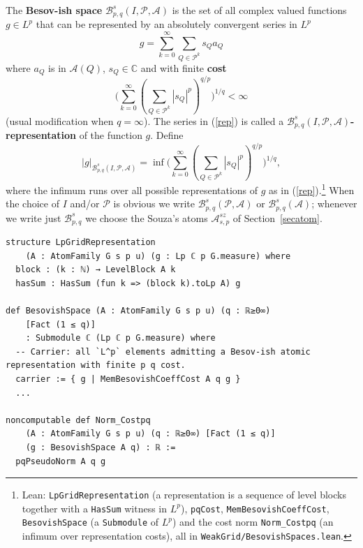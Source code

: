 \documentclass[11pt]{amsart}
\theoremstyle{definition}
\newcommand{\lean}[1]{\texttt{#1}}
\begin{document}
The {\bf Besov-ish space} $\mathcal{B}^s_{p,q}(I,\mathcal{P},\mathcal{A})$ is
the set of all complex valued functions $g \in L^p$ that can be represented by
an absolutely convergent series in $L^p$
\begin{equation} \label{rep} g = \sum_{k=0}^{\infty} \sum_{Q \in \mathcal{P}^k} s_Q a_Q\end{equation}
where $a_Q$ is in $\mathcal{A}(Q)$, $s_Q \in \mathbb{C}$ and with finite
{\bf cost}
\begin{equation} \label{rep2} \big( \sum_{k=0}^{\infty} (\sum_{Q \in \mathcal{P}^k} |s_Q|^p)^{q/p} \big)^{1/q} < \infty\end{equation}
(usual modification when $q = \infty$). The series in (\ref{rep}) is called a
{\bf $\mathcal{B}^s_{p,q}(I,\mathcal{P},\mathcal{A})$-representation} of the
function $g$. Define
$$|g|_{\mathcal{B}^s_{p,q}(I,\mathcal{P},\mathcal{A})} = \inf \big( \sum_{k=0}^{\infty} (\sum_{Q \in \mathcal{P}^k} |s_Q|^p )^{q/p} \big)^{1/q},$$
where the infimum runs over all possible representations of $g$ as in
(\ref{rep}).\footnote{Lean: \lean{LpGridRepresentation} (a representation is a
sequence of level blocks together with a \lean{HasSum} witness in $L^p$),
\lean{pqCost}, \lean{MemBesovishCoeffCost}, \lean{BesovishSpace} (a
\lean{Submodule} of $L^p$) and the cost norm \lean{Norm\_Costpq} (an infimum
over representation costs), all in \lean{WeakGrid/BesovishSpaces.lean}.}
When the choice of $I$ and/or $\mathcal{P}$ is obvious we write
$\mathcal{B}^s_{p,q}(\mathcal{P},\mathcal{A})$ or
$\mathcal{B}^s_{p,q}(\mathcal{A})$; whenever we write just
$\mathcal{B}^s_{p,q}$ we choose the Souza's atoms $\mathcal{A}^{sz}_{s,p}$ of
Section~\ref{secatom}.
\begin{lstlisting}[style=lean]
structure LpGridRepresentation
    (A : AtomFamily G s p u) (g : Lp ℂ p G.measure) where
  block : (k : ℕ) → LevelBlock A k
  hasSum : HasSum (fun k => (block k).toLp A) g

def BesovishSpace (A : AtomFamily G s p u) (q : ℝ≥0∞)
    [Fact (1 ≤ q)]
    : Submodule ℂ (Lp ℂ p G.measure) where
  -- Carrier: all `L^p` elements admitting a Besov-ish atomic representation with finite p q cost.
  carrier := { g | MemBesovishCoeffCost A q g }
  ...

noncomputable def Norm_Costpq
    (A : AtomFamily G s p u) (q : ℝ≥0∞) [Fact (1 ≤ q)]
    (g : BesovishSpace A q) : ℝ :=
  pqPseudoNorm A q g
\end{lstlisting}
\end{document}
